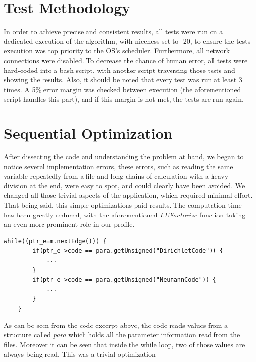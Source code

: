 \documentclass[a4paper,10pt,openright,openbib,twocolumn]{article}
\begin{document}
\section{Test Methodology} %
\label{sec:test_methodology}

In order to achieve precise and consistent results, all tests were run on a dedicated execution of the algorithm, with niceness set to -20, to ensure the tests execution was top priority to the OS's scheduler. Furthermore, all network connections were disabled. To decrease the chance of human error, all tests were hard-coded into a bash script, with another script traversing those tests and showing the results. Also, it should be noted that every test was run at least 3 times. A 5\% error margin was checked between execution (the aforementioned script handles this part), and if this margin is not met, the tests are run again. 



\section{Sequential Optimization}
\label{sec:sequentialopt}

After dissecting the code and understanding the problem at hand, we began to notice several implementation errors, these errors, such as reading the same variable repeatedly from a file and long chains of calculation with a heavy division at the end, were easy to spot, and could clearly have been avoided. We changed all those trivial aspects of the application, which required minimal effort. That being said, this simple optimizations paid results. The computation time has been greatly reduced, with the aforementioned \emph{LUFactorize} function taking an even more prominent role in our profile.

\begin{minipage}{.45\textwidth}
\lstset{
    language=C++,
    basicstyle=\ttfamily\small,
    breaklines=true
}
\begin{lstlisting}[caption=Excerpt from makeFlux]
    while((ptr_e=m.nextEdge())) {
        if(ptr_e->code == para.getUnsigned("DirichletCode")) {
            ...
        }
        if(ptr_e->code == para.getUnsigned("NeumannCode")) {
            ...
        }
    }
\end{lstlisting}
\end{minipage}

As can be seen from the code excerpt above, the code reads values from a structure called \emph{para} which holds all the parameter information read from the files. Moreover it can be seen that inside the while loop, two of those values are always being read. This was a trivial optimization
\end{document}
